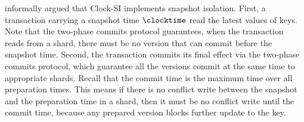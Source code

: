 

\citet{clocksi} informally argued that Clock-SI implements snapshot isolation.
First, a transaction carrying a snapshot time \( \clocktime \) read the latest values of keys.
Note that the two-phase commits protocol guarantees, when the transaction reads from a shard, 
there must be no version that can commit before the snapshot time.
Second, the transaction commits its final effect via the two-phase commits protocol,
which guarantee all the versions commit at the same time to appropriate shards.
Recall that the commit time is the maximum time over all preparation times.
This means if there is no conflict write between the snapshot and the preparation time in a shard,
then it must be no conflict write until the commit time,
because any prepared version blocks further update to the key.
